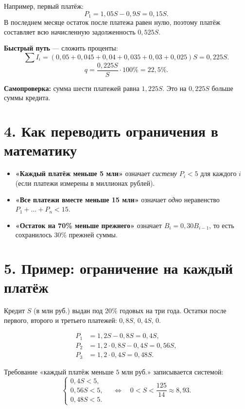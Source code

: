 \documentclass[a4paper,12pt]{article}
\newcommand{\key}[1]{\textcolor{darkaccent}{\textbf{#1}}}
\newcommand{\fboxeq}[1]{\[\boxed{#1}\]}
\begin{document}
Например, первый платёж:
\[
P_1=1{,}05S-0{,}9S=0{,}15S.
\]
В последнем месяце остаток после платежа равен нулю, поэтому платёж составляет всю начисленную задолженность $0{,}525S$.

\key{Быстрый путь} --- сложить проценты:
\[
\sum I_i=(0{,}05+0{,}045+0{,}04+0{,}035+0{,}03+0{,}025)S
=0{,}225S.
\]
\fboxeq{q=\frac{0{,}225S}{S}\cdot100\%=22{,}5\%.}

\textbf{Самопроверка:} сумма шести платежей равна $1{,}225S$. Это на $0{,}225S$ больше суммы кредита.

\section*{4. Как переводить ограничения в математику}

\begin{itemize}
\item \key{«Каждый платёж меньше 5 млн»} означает \emph{систему} $P_i<5$ для каждого $i$ (если платежи измерены в миллионах рублей).
\item \key{«Все платежи вместе меньше 15 млн»} означает \emph{одно} неравенство $P_1+\dots+P_n<15$.
\item \key{«Остаток на 70\% меньше прежнего»} означает $B_{i}=0{,}30B_{i-1}$, то есть сохранилось $30\%$ прежней суммы.
\end{itemize}

\clearpage
\section*{5. Пример: ограничение на каждый платёж}

Кредит $S$ (в млн руб.) выдан под $20\%$ годовых на три года. Остатки после первого, второго и третьего платежей: $0{,}8S$, $0{,}4S$, $0$.

\[
\begin{aligned}
P_1&=1{,}2S-0{,}8S=0{,}4S,\\
P_2&=1{,}2\cdot0{,}8S-0{,}4S=0{,}56S,\\
P_3&=1{,}2\cdot0{,}4S=0{,}48S.
\end{aligned}
\]

Требование «каждый платёж меньше $5$ млн руб.» записывается системой:
\[
\begin{cases}
0{,}4S<5,\\
0{,}56S<5,\\
0{,}48S<5.
\end{cases}
\quad\Longleftrightarrow\quad
0<S<\frac{125}{14}\approx8{,}93.
\]
\end{document}
